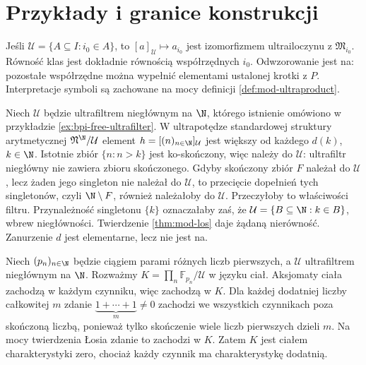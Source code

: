 \section{Przykłady i granice konstrukcji}
\begin{przyklad}
\label{ex:mod-principal-ultraproduct}
Jeśli $\mathcal U=\{A\subseteq I:i_0\in A\}$, to
$[a]_{\mathcal U}\mapsto a_{i_0}$ jest izomorfizmem
ultrailoczynu z $\mathfrak M_{i_0}$. Równość klas jest
dokładnie równością współrzędnych $i_0$. Odwzorowanie jest
na: pozostałe współrzędne można wypełnić elementami ustalonej
krotki z $P$. Interpretacje symboli są zachowane na mocy
definicji \ref{def:mod-ultraproduct}.
\end{przyklad}

\begin{przyklad}
\label{ex:mod-ultrapower-naturals}
Niech $\mathcal U$ będzie ultrafiltrem niegłównym na $\N$,
którego istnienie omówiono w przykładzie \ref{ex:bpi-free-ultrafilter}.
W ultrapotędze standardowej struktury arytmetycznej
$\mathfrak N^\N/\mathcal U$ element $h=[(n)_{n\in\N}]_{\mathcal U}$
jest większy od każdego $d(k)$, $k\in\N$. Istotnie zbiór
$\{n:n>k\}$ jest ko-skończony, więc należy do $\mathcal U$:
ultrafiltr niegłówny nie zawiera zbioru skończonego. Gdyby skończony zbiór $F$ należał do $\mathcal U$, lecz
żaden jego singleton nie należał do $\mathcal U$, to przecięcie
dopełnień tych singletonów, czyli $\N\setminus F$, również
należałoby do $\mathcal U$. Przeczyłoby to właściwości filtru.
Przynależność singletonu $\{k\}$ oznaczałaby zaś, że
$\mathcal U=\{B\subseteq\N:k\in B\}$, wbrew niegłówności. Twierdzenie \ref{thm:mod-los} daje żądaną nierówność.
Zanurzenie $d$ jest elementarne, lecz nie jest na.
\end{przyklad}

\begin{przyklad}
\label{ex:mod-ultraproduct-fields}
Niech $(p_n)_{n\in\N}$ będzie ciągiem parami różnych liczb
pierwszych, a $\mathcal U$ ultrafiltrem niegłównym na $\N$.
Rozważmy $K=\prod_n\mathbb F_{p_n}/\mathcal U$ w języku ciał.
Aksjomaty ciała zachodzą w każdym czynniku, więc zachodzą w $K$.
Dla każdej dodatniej liczby całkowitej $m$ zdanie
$\underbrace{1+\cdots+1}_{m}\ne0$ zachodzi we wszystkich
czynnikach poza skończoną liczbą, ponieważ tylko skończenie
wiele liczb pierwszych dzieli $m$. Na mocy twierdzenia Łosia
zdanie to zachodzi w $K$. Zatem $K$ jest ciałem charakterystyki
zero, chociaż każdy czynnik ma charakterystykę dodatnią.
\end{przyklad}


